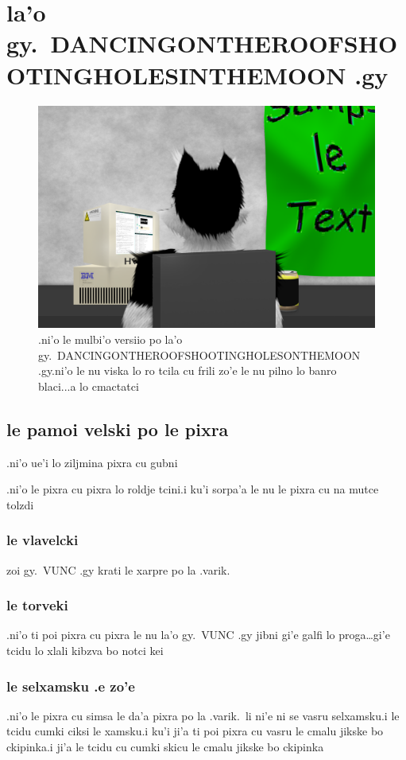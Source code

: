 \documentclass{report}
\begin{document}
\chapter{la'o gy.\ DANCINGONTHEROOFSHOOTINGHOLESINTHEMOON .gy}
\begin{figure}[ht]
	\centering
	\includegraphics[width=\textwidth]{dancingontheroofshootingholesinthemoon/dancingontheroofshootingholesinthemoon.png}
	\caption[center]{.ni'o le mulbi'o versiio po la'o gy.\ DANCINGONTHEROOFSHOOTINGHOLESONTHEMOON .gy\@  .ni'o le nu viska lo ro tcila cu frili zo'e le nu pilno lo banro blaci...a lo cmactatci}
\end{figure}
\section{le pamoi velski po le pixra}
.ni'o ue'i lo ziljmina pixra cu gubni

.ni'o le pixra cu pixra lo roldje tcini\@  .i ku'i sorpa'a le nu le pixra cu na mutce tolzdi

\subsection{le vlavelcki}
zoi gy.\ VUNC .gy krati le xarpre po la .varik.
\subsection{le torveki}
.ni'o ti poi pixra cu pixra le nu la'o gy.\ VUNC .gy jibni gi'e galfi lo proga\ldots gi'e tcidu lo xlali kibzva bo notci kei

\subsection{le selxamsku .e zo'e}
.ni'o le pixra cu simsa le da'a pixra po la .varik.\ li ni'e ni se vasru selxamsku\@  .i le tcidu cumki ciksi le xamsku\@  .i ku'i ji'a ti poi pixra cu vasru le cmalu jikske bo ckipinka\@  .i ji'a le tcidu cu cumki skicu le cmalu jikske bo ckipinka
\end{document}
